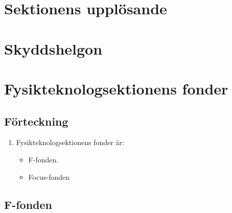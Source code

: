 \documentclass[11pt,a4paper]{article}
\begin{document}
\newpage

\section{Sektionens upplösande}
\section{Skyddshelgon}


\section{Fysikteknologsektionens fonder}

\subsection{Förteckning}

\begin{enumerate}[\thesubsection .1]
  \item Fysikteknologsektionens fonder är:
    \begin{itemize}
      \item F-fonden.
	  \item Focus-fonden
    \end{itemize}
\end{enumerate}

\subsection{F-fonden}
\end{document}
